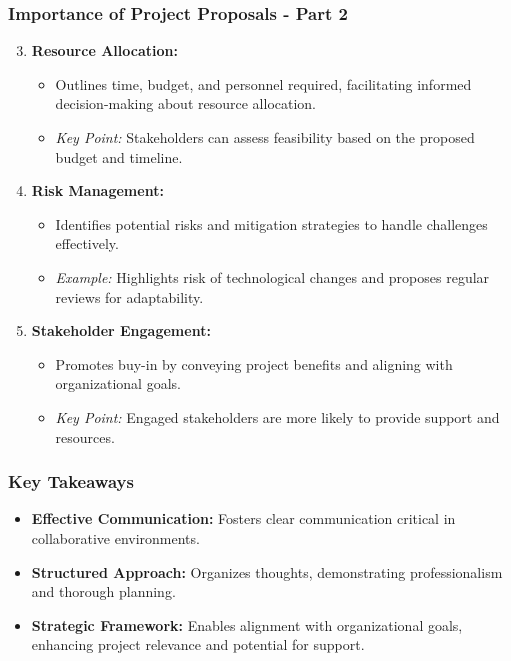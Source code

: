 \documentclass[aspectratio=169]{beamer}
\begin{document}
\begin{frame}[fragile]
    \frametitle{Importance of Project Proposals - Part 2}
    \begin{enumerate}
        \setcounter{enumi}{2}
        \item \textbf{Resource Allocation:}
            \begin{itemize}
                \item Outlines time, budget, and personnel required, facilitating informed decision-making about resource allocation.
                \item \textit{Key Point:} Stakeholders can assess feasibility based on the proposed budget and timeline.
            \end{itemize}
        
        \item \textbf{Risk Management:}
            \begin{itemize}
                \item Identifies potential risks and mitigation strategies to handle challenges effectively.
                \item \textit{Example:} Highlights risk of technological changes and proposes regular reviews for adaptability.
            \end{itemize}

        \item \textbf{Stakeholder Engagement:}
            \begin{itemize}
                \item Promotes buy-in by conveying project benefits and aligning with organizational goals.
                \item \textit{Key Point:} Engaged stakeholders are more likely to provide support and resources.
            \end{itemize}
    \end{enumerate}
\end{frame}

\begin{frame}[fragile]
    \frametitle{Key Takeaways}
    \begin{itemize}
        \item \textbf{Effective Communication:} Fosters clear communication critical in collaborative environments.
        \item \textbf{Structured Approach:} Organizes thoughts, demonstrating professionalism and thorough planning.
        \item \textbf{Strategic Framework:} Enables alignment with organizational goals, enhancing project relevance and potential for support.
    \end{itemize}
\end{frame}
\end{document}
